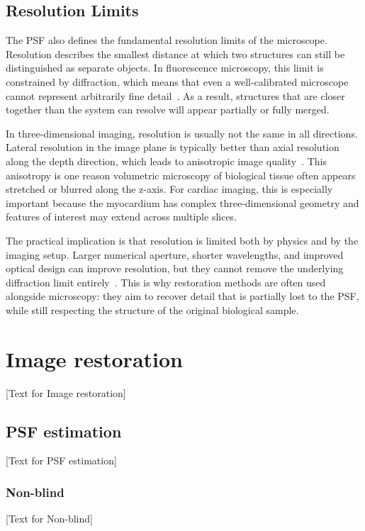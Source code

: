 \subsection{Resolution Limits}

The PSF also defines the fundamental resolution limits of the microscope. Resolution describes the smallest distance at which two structures can still be distinguished as separate objects. In fluorescence microscopy, this limit is constrained by diffraction, which means that even a well-calibrated microscope cannot represent arbitrarily fine detail~\cite{...}. As a result, structures that are closer together than the system can resolve will appear partially or fully merged.

In three-dimensional imaging, resolution is usually not the same in all directions. Lateral resolution in the image plane is typically better than axial resolution along the depth direction, which leads to anisotropic image quality~\cite{...}. This anisotropy is one reason volumetric microscopy of biological tissue often appears stretched or blurred along the z-axis. For cardiac imaging, this is especially important because the myocardium has complex three-dimensional geometry and features of interest may extend across multiple slices.

The practical implication is that resolution is limited both by physics and by the imaging setup. Larger numerical aperture, shorter wavelengths, and improved optical design can improve resolution, but they cannot remove the underlying diffraction limit entirely~\cite{...}. This is why restoration methods are often used alongside microscopy: they aim to recover detail that is partially lost to the PSF, while still respecting the structure of the original biological sample.

\section{Image restoration}
[Text for Image restoration]

\subsection{PSF estimation}
[Text for PSF estimation]

\subsubsection{Non-blind}
[Text for Non-blind]

